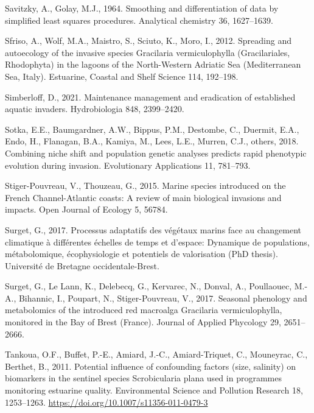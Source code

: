 \documentclass[
  letterpaper,
  DIV=11,
  numbers=noendperiod]{scrartcl}
\newlength{\cslhangindent}
\newenvironment{CSLReferences}[2] %
 {\begin{list}{}{%
  \setlength{\itemindent}{0pt}
  \setlength{\leftmargin}{0pt}
  \setlength{\parsep}{0pt}
  \ifodd #1
   \setlength{\leftmargin}{\cslhangindent}
   \setlength{\itemindent}{-1\cslhangindent}
  \fi
  \setlength{\itemsep}{#2\baselineskip}}}
 {\end{list}}
\begin{document}
\begin{CSLReferences}{1}{0}
Savitzky, A., Golay, M.J., 1964. Smoothing and differentiation of data
by simplified least squares procedures. Analytical chemistry 36,
1627--1639.

Sfriso, A., Wolf, M.A., Maistro, S., Sciuto, K., Moro, I., 2012.
Spreading and autoecology of the invasive species {G}racilaria
vermiculophylla ({G}racilariales, {R}hodophyta) in the lagoons of the
{N}orth-{W}estern {A}driatic {S}ea ({M}editerranean {S}ea, {I}taly).
Estuarine, Coastal and Shelf Science 114, 192--198.

Simberloff, D., 2021. Maintenance management and eradication of
established aquatic invaders. Hydrobiologia 848, 2399--2420.

Sotka, E.E., Baumgardner, A.W., Bippus, P.M., Destombe, C., Duermit,
E.A., Endo, H., Flanagan, B.A., Kamiya, M., Lees, L.E., Murren, C.J.,
others, 2018. Combining niche shift and population genetic analyses
predicts rapid phenotypic evolution during invasion. Evolutionary
Applications 11, 781--793.

Stiger-Pouvreau, V., Thouzeau, G., 2015. Marine species introduced on
the {F}rench {C}hannel-{A}tlantic coasts: A review of main biological
invasions and impacts. Open Journal of Ecology 5, 56784.

Surget, G., 2017. Processus adaptatifs des v{é}g{é}taux marins face au
changement climatique {à} diff{é}rentes {é}chelles de temps et d'espace:
Dynamique de populations, m{é}tabolomique, {é}cophysiologie et
potentiels de valorisation (PhD thesis). Universit{é} de Bretagne
occidentale-Brest.

Surget, G., Le Lann, K., Delebecq, G., Kervarec, N., Donval, A.,
Poullaouec, M.-A., Bihannic, I., Poupart, N., Stiger-Pouvreau, V., 2017.
Seasonal phenology and metabolomics of the introduced red macroalga
{G}racilaria vermiculophylla, monitored in the {B}ay of {B}rest
({F}rance). Journal of Applied Phycology 29, 2651--2666.

Tankoua, O.F., Buffet, P.-E., Amiard, J.-C., Amiard-Triquet, C.,
Mouneyrac, C., Berthet, B., 2011. Potential influence of confounding
factors (size, salinity) on biomarkers in the sentinel species
{S}crobicularia plana used in programmes monitoring estuarine quality.
Environmental Science and Pollution Research 18, 1253--1263.
\url{https://doi.org/10.1007/s11356-011-0479-3}


\end{CSLReferences}
\end{document}
